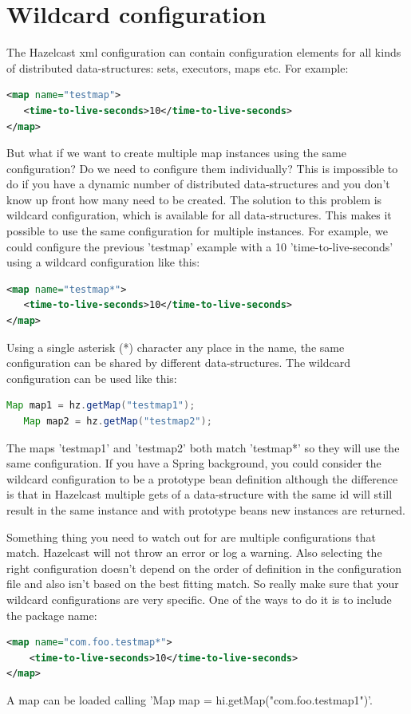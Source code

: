 \section{Wildcard configuration}
The Hazelcast xml configuration can contain configuration elements for all kinds of distributed data-structures: sets, executors, maps etc. For example:
\begin{lstlisting}[language=xml]
<map name="testmap">
   <time-to-live-seconds>10</time-to-live-seconds>
</map>
\end{lstlisting}
But what if we want to create multiple map instances using the same configuration? Do we need to configure them individually? This is impossible to do if you have a dynamic number of distributed data-structures and you don't know up front how many need to be created. The solution to this problem is wildcard configuration, which is available for all data-structures. This makes it possible to use the same configuration for multiple instances. For example, we could configure the previous 'testmap' example with a 10 'time-to-live-seconds' using a wildcard configuration like this:
\begin{lstlisting}[language=xml]
<map name="testmap*">
   <time-to-live-seconds>10</time-to-live-seconds>
</map>
\end{lstlisting}
Using a single asterisk (*) character any place in the name, the same configuration can be shared by different  data-structures. The wildcard configuration can be used like this:
\begin{lstlisting}[language=java]
   Map map1 = hz.getMap("testmap1");
   Map map2 = hz.getMap("testmap2");
\end{lstlisting}
The maps 'testmap1' and 'testmap2' both match 'testmap*' so they will use the same configuration. If you have a Spring background, you could consider the wildcard configuration to be a prototype bean definition although the difference is that in Hazelcast multiple gets of a data-structure with the same id will still result in the same instance and with prototype beans new instances are returned.

Something thing you need to watch out for are multiple configurations that match. Hazelcast will not throw an error or log a warning. Also selecting the right configuration doesn't depend on the order of definition in the configuration file and also isn't based on the best fitting match. So really make sure that your wildcard configurations are very specific. One of the ways to do it is to include the package name:
\begin{lstlisting}[language=xml]
<map name="com.foo.testmap*">
    <time-to-live-seconds>10</time-to-live-seconds>
</map>
\end{lstlisting}
A map can be loaded calling 'Map map = hi.getMap("com.foo.testmap1")'. 

